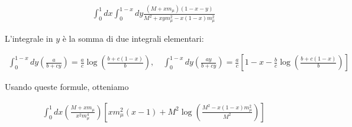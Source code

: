 \documentclass[11pt]{report}
\begin{document}
\begin{align}
    \int_0^1 dx \int_0^{1-x}dy \frac{(M+xm_\mu)(1-x-y)}{M^2 +xym^2_\mu - x(1-x)m^2_\mu}
\end{align}

L'integrale in \(y\) è la somma di due integrali elementari: 

\begin{align}
    \int_0^{1-x}dy \left(\frac{a}{b+cy}\right) = \frac{a}{c}\log\left(\frac{b +c(1-x)}{b} \right), \quad \int_0^{1-x}dy \left(\frac{ay}{b+cy}\right) = \frac{a}{c}\left[1-x-\frac{b}{c}\log\left(\frac{b+c(1-x)}{b} \right) \right]
\end{align}

Usando queste formule, otteniamo

\begin{align}
    \int_0^1 dx \left(\frac{M+xm_\mu}{x^2 m_\mu^4} \right)\left[xm_\mu^2(x-1) + M^2\log\left(\frac{M^2-x(1-x)m_\mu^2}{M^2} \right)\right]
\end{align}
\end{document}
